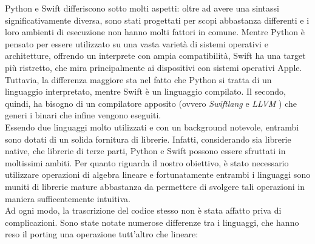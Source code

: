 Python e Swift differiscono sotto molti aspetti: oltre ad avere una sintassi
significativamente diversa, sono stati progettati per scopi abbastanza 
differenti e i loro ambienti di esecuzione non hanno molti fattori 
in comune. Mentre Python è pensato per essere utilizzato su una vasta
varietà di sistemi operativi e architetture, offrendo un interprete
con ampia compatibilità, Swift ha una target più ristretto, che 
mira principalmente ai dispositivi con sistemi operativi Apple.
Tuttavia, la differenza maggiore sta nel fatto che Python si tratta
di un linguaggio interpretato, mentre Swift è un linguaggio compilato. 
Il secondo, quindi, ha bisogno di un compilatore apposito (ovvero \emph{Swiftlang} 
e \emph{LLVM} \cite{llvm_clang}) che generi
i binari che infine vengono eseguiti.\\
Essendo due linguaggi molto utilizzati e con un background notevole,
entrambi sono dotati di un solida fornitura di librerie. Infatti, 
considerando sia librerie native, che librerie di terze parti,
Python e Swift possono essere sfruttati in moltissimi ambiti.
Per quanto riguarda il nostro obiettivo, è stato necessario
utilizzare operazioni di algebra lineare e fortunatamente entrambi i
linguaggi sono muniti di librerie mature abbastanza da permettere di 
svolgere tali operazioni in maniera sufficentemente intuitiva.\\
Ad ogni modo, la trascrizione del codice stesso non è stata affatto
priva di complicazioni. Sono state notate numerose differenze tra i
linguaggi, che hanno reso il porting una operazione tutt'altro che 
lineare:
